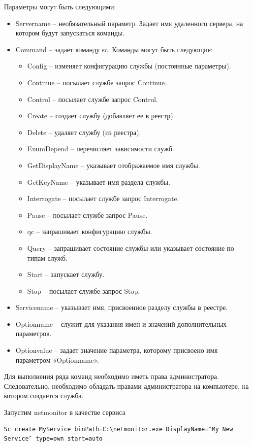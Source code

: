 Параметры могут быть следующими:
\begin{itemize}
\item Servername -- необязательный параметр. Задает имя удаленного сервера, на котором будут запускаться команды.
\item Command -- задает команду sc. Команды могут быть следующие:
\begin{itemize}
\item Config -- изменяет конфигурацию службы (постоянные параметры).
\item Continue -- посылает службе запрос Continue.
\item Control -- посылает службе запрос Control.
\item Create -- создает службу (добавляет ее в реестр).
\item Delete -- удаляет службу (из реестра).
\item EnumDepend -- перечисляет зависимости служб.
\item GetDisplayName -- указывает отображаемое имя службы.
\item GetKeyName -- указывает имя раздела службы.
\item Interrogate -- посылает службе запрос Interrogate.
\item Pause -- посылает службе запрос Pause.
\item qc -- запрашивает конфигурацию службы.
\item Query -- запрашивает состояние службы или указывает состояние по типам служб.
\item Start -- запускает службу.
\item Stop -- посылает службе запрос Stop.
\end{itemize}
\item Servicename -- указывает имя, присвоенное разделу службы в реестре.
\item Optionname -- служит для указания имен и значений дополнительных параметров.
\item Optionvalue -- задает значение параметра, которому присвоено имя параметром «Optionname».
\end{itemize}

Для выполнения ряда команд необходимо иметь права администратора. Следовательно, необходимо обладать правами администратора на компьютере, на котором создается служба.

Запустим netmonitor в качестве сервиса

\begin{Verbatim}[frame=single]
Sc create MyService binPath=C:\netmonitor.exe DisplayName=″My New Service″ type=own start=auto
\end{Verbatim}

